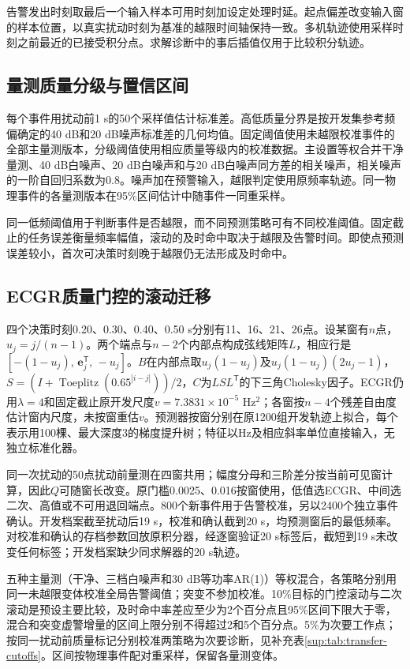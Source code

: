 \documentclass[UTF8,a4paper,11pt]{ctexart}
\begin{document}
告警发出时刻取最后一个输入样本可用时刻加设定处理时延。起点偏差改变输入窗的样本位置，以真实扰动时刻为基准的越限时间轴保持一致。多机轨迹使用采样时刻之前最近的已接受积分点。求解诊断中的事后插值仅用于比较积分轨迹。

\subsection{量测质量分级与置信区间}
每个事件用扰动前1 s的50个采样值估计标准差。高低质量分界是按开发集参考频偏确定的40 dB和20 dB噪声标准差的几何均值。固定阈值使用未越限校准事件的全部主量测版本，分级阈值使用相应质量等级内的校准数据。主设置等权合并干净量测、40 dB白噪声、20 dB白噪声和与20 dB白噪声同方差的相关噪声，相关噪声的一阶自回归系数为0.8。噪声加在预警输入，越限判定使用原频率轨迹。同一物理事件的各量测版本在95\%区间估计中随事件一同重采样。

同一低频阈值用于判断事件是否越限，而不同预测策略可有不同校准阈值。固定截止的任务误差衡量频率幅值，滚动的及时命中取决于越限及告警时间。即使点预测误差较小，首次可决策时刻晚于越限仍无法形成及时命中。

\subsection{ECGR质量门控的滚动迁移}\label{sec:roll-transfer}
四个决策时刻0.20、0.30、0.40、0.50 s分别有11、16、21、26点。设某窗有$n$点，$u_j=j/(n-1)$。两个端点与$n-2$个内部点构成弦线矩阵$L$，相应行是$[-(1-u_j),\,\boldsymbol e_j^\mathsf T,\,-u_j]$。$B$在内部点取$u_j(1-u_j)$及$u_j(1-u_j)(2u_j-1)$，$S=(I+\operatorname{Toeplitz}(0.65^{|i-j|}))/2$，$C$为$LSL^\mathsf T$的下三角Cholesky因子。ECGR仍用$\lambda=4$和固定截止原开发尺度$v=7.3831\times10^{-5}$ Hz$^2$；各窗按$n-4$个残差自由度估计窗内尺度，未按窗重估$v$。预测器按窗分别在原1200组开发轨迹上拟合，每个表示用100棵、最大深度3的梯度提升树；特征以Hz及相应斜率单位直接输入，无独立标准化器。

同一次扰动的50点扰动前量测在四窗共用；幅度分母和三阶差分按当前可见窗计算，因此$Q$可随窗长改变。原门槛0.0025、0.016按窗使用，低值选ECGR、中间选二次、高值或不可用退回端点。800个新事件用于告警校准，另以2400个独立事件确认。开发档案截至扰动后19 s，校准和确认截到20 s，均预测窗后的最低频率。对校准和确认的存档参数回放原积分器，经逐窗验证20 s标签后，截短到19 s未改变任何标签；开发档案缺少同求解器的20 s轨迹。

五种主量测（干净、三档白噪声和30 dB等功率AR(1)）等权混合，各策略分别用同一未越限变体校准全局告警阈值；突变不参加校准。10\%目标的门控滚动与二次滚动是预设主要比较，及时命中率差应至少为2个百分点且95\%区间下限大于零，混合和突变虚警增量的区间上限分别不得超过2和5个百分点。5\%为次要工作点；按同一扰动前质量标记分别校准两策略为次要诊断，见补充表\ref{sup:tab:transfer-cutoffs}。区间按物理事件配对重采样，保留各量测变体。
\end{document}

